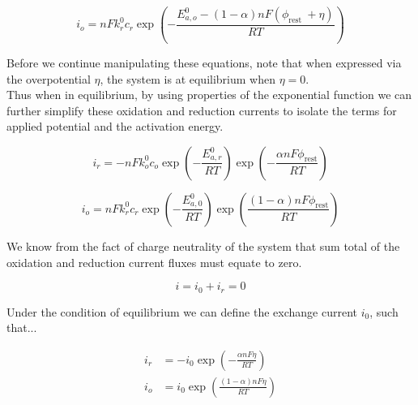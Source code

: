\documentclass[lettersize,journal]{IEEEtran}
\begin{document}
\begin{equation}
i_{o}=n F k_{r}^{0} c_{r} \exp \left(-\frac{E_{a, o}^{0}-(1-\alpha) n F\left(\phi_{\text {rest }}+\eta\right)}{R T}\right)
\end{equation}


\noindent Before we continue manipulating these equations, note that when expressed via the overpotential $\eta$, the system is at equilibrium when $\eta = 0$.  \\

\noindent Thus when in equilibrium, by using properties of the exponential function we can further simplify these oxidation and reduction currents to isolate the terms for applied potential and the activation energy.

\begin{equation}
i_{r}=-n F k_{o}^{0} c_{o} \exp \left(-\frac{E_{a, r}^{0}}{R T}\right) \exp \left(-\frac{\alpha n F \phi_{\mathrm{rest}}}{R T}\right)
\end{equation}

\begin{equation}
i_{o}=n F k_{r}^{0} c_{r} \exp \left(-\frac{E_{a, 0}^{0}}{R T}\right) \exp \left(\frac{(1-\alpha) n F \phi_{\mathrm{rest}}}{R T}\right)
\end{equation}

\noindent We know from the fact of charge neutrality of the system that sum total of the oxidation and reduction current fluxes must equate to zero.

\begin{equation}
i=i_{0}+i_{r}=0
\end{equation}






\noindent Under the condition of equilibrium we can define the exchange current $i_0$, such that...


\begin{equation}
\begin{aligned}
i_{r} &=-i_{0} \exp \left(-\frac{\alpha n F \eta}{R T}\right) \\
i_{o} &=i_{0} \exp \left(\frac{(1-\alpha) n F \eta}{R T}\right)
\end{aligned}
\end{equation}
\end{document}

